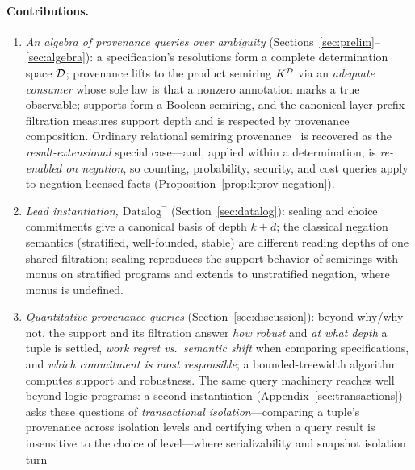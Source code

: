 \paragraph{Contributions.}
\begin{enumerate}[label=(\roman*),nosep,leftmargin=*]
  \item \emph{An algebra of provenance queries over ambiguity}
        (Sections~\ref{sec:prelim}--\ref{sec:algebra}): a specification's
        resolutions form a complete determination space $\mathcal{D}$; provenance
        lifts to the product semiring $K^{\mathcal{D}}$ via an \emph{adequate
        consumer} whose sole law is that a nonzero annotation marks a true
        observable; supports form a Boolean semiring, and the canonical
        layer-prefix filtration measures support depth and is respected by
        provenance composition. Ordinary relational semiring
        provenance~\cite{green2007provenance} is recovered as the
        \emph{result-extensional} special case---and, applied within a
        determination, is \emph{re-enabled on negation}, so counting,
        probability, security, and cost queries apply to negation-licensed
        facts (Proposition~\ref{prop:kprov-negation}).
  \ifleaddatalog
  \item \emph{Lead instantiation, $\mbox{Datalog}^\neg$}
        (Section~\ref{sec:datalog}): sealing and choice commitments give a
        canonical basis of depth $k{+}d$; the classical negation semantics
        (stratified, well-founded, stable) are different reading depths of one
        shared filtration; sealing reproduces the support behavior of
        semirings with monus on stratified programs and extends to
        unstratified negation, where monus is undefined.
    \item \emph{Quantitative provenance queries}
          (Section~\ref{sec:discussion}): beyond why/why-not, the support and its
          filtration answer \emph{how robust} and \emph{at what depth} a tuple is
          settled, \emph{work regret vs.\ semantic shift} when comparing
          specifications, and \emph{which commitment is most responsible}; a
          bounded-treewidth algorithm computes support and robustness. The same
          query machinery reaches well beyond logic programs: a second
          instantiation (Appendix~\ref{sec:transactions}) asks these questions of
          \emph{transactional isolation}---comparing a tuple's provenance across
          isolation levels and certifying when a query result is insensitive to
          the choice of level---where serializability and snapshot isolation turn

\end{enumerate}
